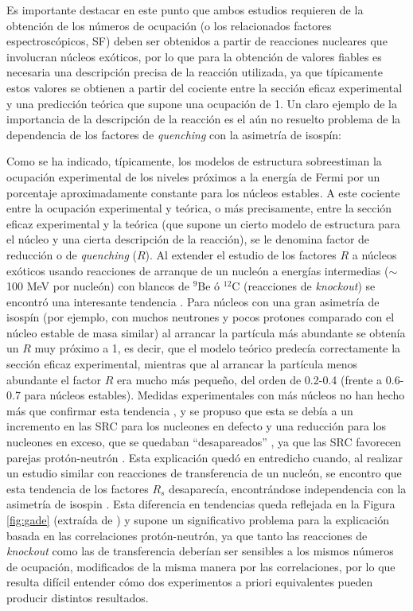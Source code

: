 \documentclass[a4paper,12pt,twoside]{article}
\begin{document}
Es importante destacar en este punto que ambos estudios requieren de la obtención de los números de ocupación (o los relacionados factores espectroscópicos, SF) deben ser obtenidos a partir de reacciones nucleares que involucran núcleos exóticos, por lo que para la obtención de valores fiables es necesaria una descripción precisa de la reacción utilizada, ya que típicamente estos valores se obtienen a partir del cociente entre la sección eficaz experimental y una predicción teórica que supone una ocupación de 1. Un claro ejemplo de la importancia de la descripción de la reacción es el aún no resuelto problema de la dependencia de los factores de \textit{quenching} con la asimetría de isospín:

Como se ha indicado, típicamente, los modelos de estructura sobreestiman la ocupación experimental de los niveles próximos a la energía de Fermi por un porcentaje aproximadamente constante para los núcleos estables. A este cociente entre la ocupación experimental y teórica, o más precisamente, entre la sección eficaz experimental y la teórica (que supone un cierto modelo de estructura para el núcleo y una cierta descripción de la reacción), se le denomina factor de reducción o de \textit{quenching} ($R$). Al extender el estudio de los factores $R$ a núcleos exóticos usando reacciones de arranque de un nucleón a energías intermedias ($\sim$100 MeV por nucleón) con blancos de $^9$Be ó $^{12}$C (reacciones de \textit{knockout}) se encontró una interesante tendencia \cite{Gad08}. Para núcleos con una gran asimetría de isospín (por ejemplo, con muchos neutrones y pocos protones comparado con el núcleo estable de masa similar) al arrancar la partícula más abundante se obtenía un $R$ muy próximo a 1, es decir, que el modelo teórico predecía correctamente la sección eficaz experimental, mientras que al arrancar la partícula menos abundante el factor $R$ era mucho más pequeño, del orden de 0.2-0.4 (frente a 0.6-0.7 para núcleos estables). Medidas experimentales con más núcleos no han hecho más que confirmar esta tendencia \cite{Tos14,Tos21}, y se propuso que esta se debía a un incremento en las SRC para los nucleones en defecto y una reducción para los nucleones en exceso, que se quedaban ``desapareados'' \cite{Jen11}, ya que las SRC favorecen parejas protón-neutrón \cite{Pia06,Sub08}. Esta explicación quedó en entredicho cuando, al realizar un estudio similar con reacciones de transferencia de un nucleón, se encontro que esta tendencia de los factores $R_s$ desaparecía, encontrándose independencia con la asimetría de isospin \cite{Fla13,Kay13}. Esta diferencia en tendencias queda reflejada en la Figura \ref{fig:gade} (extraída de \cite{Kay22}) y supone un significativo problema para la explicación basada en las correlaciones protón-neutrón, ya que tanto las reacciones de \textit{knockout} como las de transferencia deberían ser sensibles a los mismos números de ocupación, modificados de la misma manera por las correlaciones, por lo que resulta difícil entender cómo dos experimentos a priori equivalentes pueden producir distintos resultados. 
\end{document}
